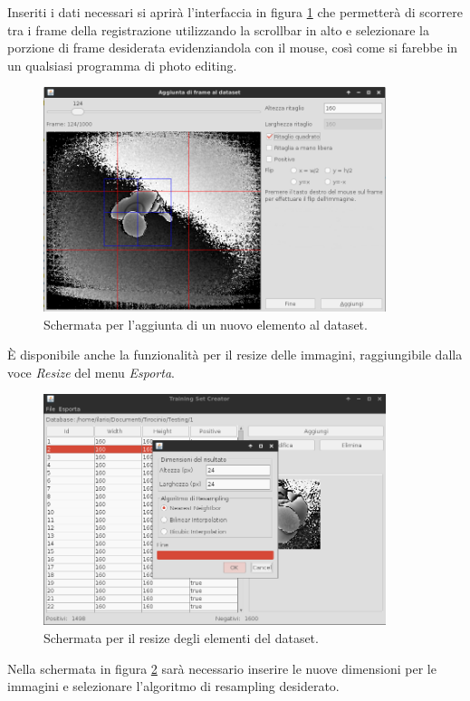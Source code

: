     Inseriti i dati necessari si aprirà l'interfaccia in figura \ref{fig:tsc_add} che permetterà di scorrere tra i frame della registrazione utilizzando la scrollbar in alto e selezionare la porzione di frame desiderata evidenziandola con il mouse, così come si farebbe in un qualsiasi programma di photo editing.
    \begin{figure}[h]
        \centering
        \includegraphics[width=10cm]{img/training_set_creator_add.png}
        \caption{Schermata per l'aggiunta di un nuovo elemento al dataset.}
        \label{fig:tsc_add}
    \end{figure}

    È disponibile anche la funzionalità per il resize delle immagini, raggiungibile dalla voce \emph{Resize} del menu \emph{Esporta}.

    \begin{figure}[h]
        \centering
        \includegraphics[width=10cm]{img/training_set_creator_resize.png}
        \caption{Schermata per il resize degli elementi del dataset.}
        \label{fig:tsc_resize}
    \end{figure}

    Nella schermata in figura \ref{fig:tsc_resize} sarà necessario inserire le nuove dimensioni per le immagini e selezionare l'algoritmo di resampling desiderato.


